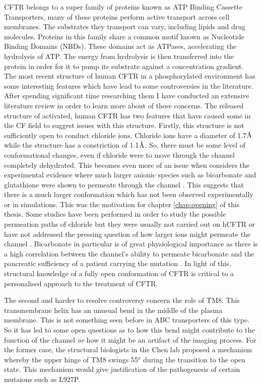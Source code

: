 CFTR belongs to a super family of proteins known as ATP Binding Cassette Transporters,  many of these proteins perform active transport across cell membranes. The substrates they transport can vary, including lipids and drug molecules. Proteins in this family share a common motif known as Nucleotide Binding Domains (NBDs). These domains act as ATPases, accelerating the hydrolysis of ATP. The energy from hydrolysis is then transferred into the protein in order for it to pump its substrate against a concentration gradient. 
The most recent structure of human CFTR in a phosphorylated environment has some interesting features which have lead to some controversies in the literature. After spending significant time researching them I have conducted an extensive literature review in order to learn more about of these concerns. The released structure of activated, human CFTR has two features that have caused some in the CF field to suggest issues with this structure. Firstly, this structure is not sufficiently open to conduct chloride ions. Chloride ions have a diameter of 1.7$\textup{\AA}$ while the structure has a constriction of 1.1$\textup{\AA}$\cite{zhang2018}. So, there must be some level of conformational changes, even if chloride were to move through the channel completely dehydrated. This becomes even more of an issue when considers the experimental evidence where much larger anionic species such as bicarbonate and glutathione were shown to permeate through the channel \cite{kogan2003}. This suggests that there is a much larger conformation which has not been observed experimentally or in simulations. This was the motivation for chapter \ref{chap:opening} of this thesis. Some studies have been performed in order to study the possible permeation paths of chloride but they were usually not carried out on hCFTR or have not addressed the pressing question of how larger ions might permeate the channel \cite{farkas2020, zeng2021}. Bicarbonate in particular is of great physiological importance as there is a high correlation between the channel's ability to permeate bicarbonate and the pancreatic sufficiency of a patient carrying the mutation \cite{}. In light of this, structural knowledge of a fully open conformation of CFTR is critical to a personalised approach to the treatment of CFTR.

The second and harder to resolve controversy concern the role of TM8. This transmembrane helix has an unusual bend in the middle of the plasma membrane. This is not something seen before in ABC transporters of this type. So it has led to some open questions as to how this bend might contribute to the function of the channel \textit{or} how it might be an artifact of the imaging process. For the former case, the structural biologists in the Chen lab proposed a mechanism whereby the upper hinge of TM8 swings 55$^o$ during the transition to the open state. This mechanism would give justification of the pathogenesis of certain mutaions such as L927P. 

